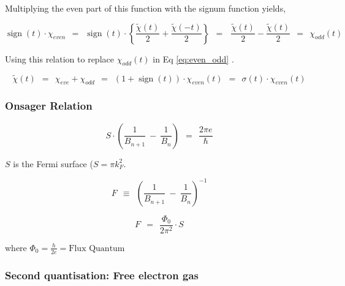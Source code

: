 \documentclass[10pt]{report}
\numberwithin{equation}{chapter}
\newcommand{\refEq}[1]{
  Eq  \ref{#1}
}
\DeclareMathOperator{\sign}{sign}
\begin{document}
Multiplying the even part of this function with the signum function yields,

\begin{equation}
  \sign(t) \cdot \chi_{even} ~~ = ~~ \sign(t) \cdot \left\{ \frac{\tilde{\chi}(t)}{2} + \frac{\tilde{\chi}(-t)}{2} \right\} ~~ = ~~~\frac{\tilde{\chi}(t)}{2} - \frac{\tilde{\chi}(t)}{2} ~~ = ~~ \chi_{odd}(t)
\end{equation}


Using this relation to replace $\chi_{odd}(t)$ in \refEq{eq:even_odd}.


\begin{equation}
\tilde{\chi}(t) ~~ = ~~ \chi_{eve} + \chi_{odd} ~~ = ~~ (1 + \sign(t)) \cdot \chi_{even}(t) ~~ = ~~ \sigma(t) \cdot \chi_{even}(t)
\end{equation}

% 

\subsubsection{Onsager Relation}

\begin{equation}
  S \cdot \left( \frac{1}{B_{n+1}} ~-~ \frac{1}{B_n} \right) ~~=~~ \frac{2 \pi e}{\hbar}
\end{equation}

$S$ is the Fermi surface ($S=\pi k_F^2$.

\begin{equation}
  F ~~\equiv~~ \left( \frac{1}{B_{n+1}} ~-~ \frac{1}{B_n} \right)^{-1}
\end{equation}

\begin{equation}
  F ~~=~~ \frac{\Phi_0}{2 \pi^2} \cdot S
\end{equation}

where $\Phi_0 = \frac{h}{2e} = \text{Flux Quantum}$



%

\subsubsection{Second quantisation: Free electron gas} %
\end{document}
